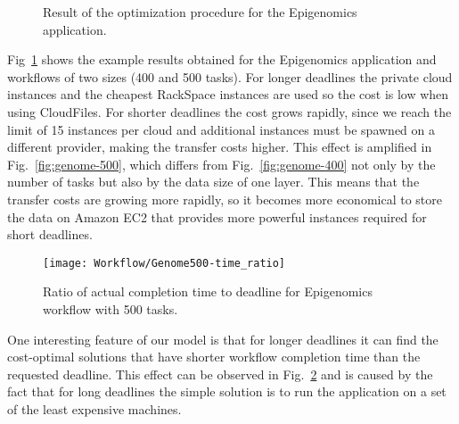 {    \begin{figure}[b] 
       \centering
       \caption{\label{fig:genome}Result of the optimization procedure for the Epigenomics application.}
    \end{figure}	

    Fig~\ref{fig:genome} shows the example results obtained for the Epigenomics
    application and workflows of two sizes (400 and 500 tasks).
    For longer deadlines the private cloud instances and the cheapest RackSpace
    instances are used so the cost is low when using CloudFiles. For shorter
    deadlines the cost grows rapidly, since we reach the limit of 15 instances
    per cloud and additional instances must be spawned on a different provider,
    making the transfer costs higher. This effect is amplified in
    Fig.~\ref{fig:genome-500}, which differs from Fig.~\ref{fig:genome-400} not
    only by the number of tasks but also by the data size of one layer.
    This means that the transfer costs are growing more rapidly, so it becomes
    more economical to store the data on Amazon EC2 that provides more powerful
    instances required for short deadlines.
    
    \begin{figure}[tb]
       \centering \texttt{[image: Workflow/Genome500-time\_ratio]}
       \caption{Ratio of actual completion time to deadline for Epigenomics workflow with 500 tasks.
       \label{fig:genome-500-ratio}}
    \end{figure}
    
    One interesting feature of our model is that for longer deadlines it can
    find the cost-optimal solutions that have shorter workflow completion time
    than the requested deadline. This effect can be observed in
    Fig.~\ref{fig:genome-500-ratio} and is caused by the fact that for long
    deadlines the simple solution is to run the application on a set of the least expensive machines. 
    
    \begin{figure}[tb] 
       \centering
        \\
       

\end{figure}}
